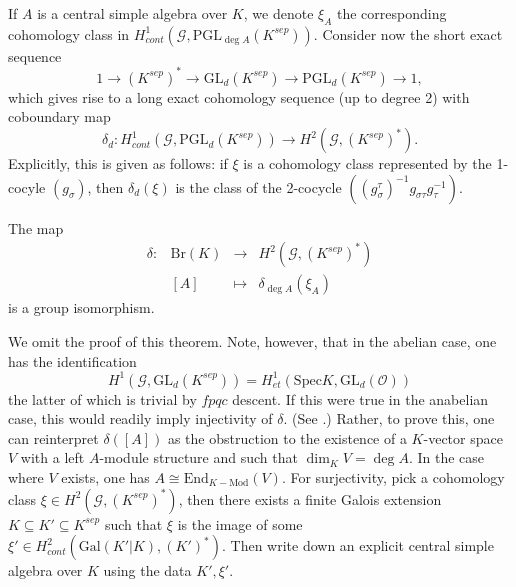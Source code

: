 \noindent
If $A$ is a central simple algebra over $K$, we denote $\xi_A$ the 
corresponding cohomology class in $H_{cont}^1 (\mathcal{G}, \text{PGL}_{\deg 
A}(K^{sep}))$. Consider now the short exact sequence 
$$
1 \to (K^{sep})^* \to \text{GL}_d(K^{sep}) \to \text{PGL}_d(K^{sep}) \to 1,
$$
 which gives rise to a long exact cohomology sequence (up to degree 2) with 
coboundary map 
 $$
 \delta_d : H_{cont} ^1(\mathcal{G}, \text{PGL}_d(K^{sep})) \to H^2 
(\mathcal{G}, (K^{sep})^*).
 $$ 
Explicitly, this is given as follows: if $\xi$ is a cohomology class 
represented by the 1-cocyle $(g_\sigma)$, then $\delta_d(\xi)$ is the class of 
the 2-cocycle $((g_\sigma^\tau)^{-1} g_{\sigma \tau} g_\tau^{-1})$. 

\begin{theorem} \label{thm:BrauerDelta}
The map
$$
\begin{array}{rrcl}
\delta : & \text{Br}(K) &  \longrightarrow & H^2(\mathcal{G}, (K^{sep})^*) \\
& [A] & \longmapsto & \delta_{\deg A} (\xi_A)
\end{array}
$$
is a group isomorphism.
\end{theorem}

\noindent
We omit the proof of this theorem. Note, however, that in the abelian case, one 
has the identification
$$
H^1 (\mathcal{G}, \text{GL}_d(K^{sep})) = H_{et}^1 (\text{Spec} K, 
\text{GL}_d(\mathcal{O}))
$$
the latter of which is trivial by $fpqc$ descent. If this were true in the 
anabelian case, this would readily imply injectivity of $\delta$. (See 
\cite{SGA4.5}.) Rather, to prove this, one can reinterpret $\delta([A])$ as the 
obstruction to the existence of a $K$-vector space $V$ with a left $A$-module 
structure and such that $\dim_K V = \deg A$. In the case where $V$ exists, one 
has $A \cong \text{End}_{K-\text{Mod}} (V)$. For surjectivity, pick a 
cohomology class $\xi \in H^2(\mathcal{G}, (K^{sep})^*)$, then there exists a 
finite Galois extension $K \subseteq K' \subseteq K^{sep}$ such that $\xi$ is 
the image of some $\xi' \in H_{cont}^2(\text{Gal}(K'|K), (K')^*)$. Then write 
down an explicit central simple algebra over $K$ using the data $K', \xi'$.

